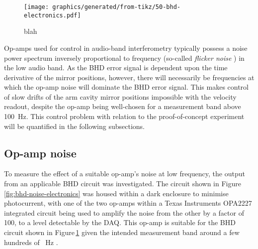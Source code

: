 \begin{figure}
  \centering
  \texttt{[image: graphics/generated/from-tikz/50-bhd-electronics.pdf]}
  \caption{\label{fig:bhd-electronics}blah}
\end{figure}

Op-amps used for control in audio-band interferometry typically possess a noise power spectrum inversely proportional to frequency (so-called \emph{flicker noise} \cite[Section\,11.2.3]{Gray2009}) in the low audio band. As the \gls{BHD} error signal is dependent upon the time derivative of the mirror positions, however, there will necessarily be frequencies at which the op-amp noise will dominate the \gls{BHD} error signal. This makes control of slow drifts of the arm cavity mirror positions impossible with the velocity readout, despite the op-amp being well-chosen for a measurement band above \SI{100}{\hertz}. This control problem with relation to the proof-of-concept experiment will be quantified in the following subsections.

\subsection{\label{sec:op-amp-noise}Op-amp noise}
     

To measure the effect of a suitable op-amp's noise at low frequency, the output from an applicable BHD circuit was investigated. The circuit shown in Figure\,\ref{fig:bhd-noise-electronics} was housed within a dark enclosure to minimise photocurrent, with one of the two op-amps within a Texas Instruments\textsuperscript{\textregistered} OPA2227 integrated circuit being used to amplify the noise from the other by a factor of \SI{100}{}, to a level detectable by the DAQ. This op-amp is suitable for the BHD circuit shown in Figure\,\ref{fig:bhd-electronics} given the intended measurement band around a few hundreds of \SI{}{\hertz} \cite{Graef2014}.

